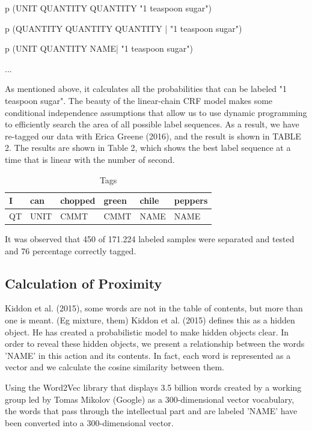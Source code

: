 p (UNIT QUANTITY QUANTITY "1 teaspoon sugar")

p (QUANTITY QUANTITY QUANTITY | "1 teaspoon sugar")

p (UNIT QUANTITY NAME| "1 teaspoon sugar")

...

As mentioned above, it calculates all the probabilities that can be labeled "1 teaspoon sugar". The beauty of the linear-chain CRF model makes some conditional independence assumptions that allow us to use dynamic programming to efficiently search the area of all possible label sequences. As a result, we have re-tagged our data with Erica Greene (2016), and the result is shown in TABLE 2. The results are shown in Table 2, which shows the best label sequence at a time that is linear with the number of second.


\begin{table}[]
\centering
\caption{Tags}
\label{my-label}
\begin{tabular}{|l|l|l|l|l|l|}
\hline
I   & can & chopped & green & chile & peppers \\ \hline
QT & UNIT  & CMMT      & CMMT    & NAME    & NAME      \\ \hline
\end{tabular}
\end{table}

It was observed that 450 of 171.224 labeled samples were separated and tested and 76 percentage correctly tagged.


\subsection{Calculation of Proximity}
Kiddon et al. (2015), some words are not in the table of contents, but more than one is meant. (Eg mixture, them) Kiddon et al. (2015) defines this as a hidden object. He has created a probabilistic model to make hidden objects clear. In order to reveal these hidden objects, we present a relationship between the words 'NAME' in this action and its contents. In fact, each word is represented as a vector and we calculate the cosine similarity between them.

Using the Word2Vec library that displays 3.5 billion words created by a working group led by Tomas Mikolov (Google) as a 300-dimensional vector vocabulary, the words that pass through the intellectual part and are labeled 'NAME' have been converted into a 300-dimensional vector.

